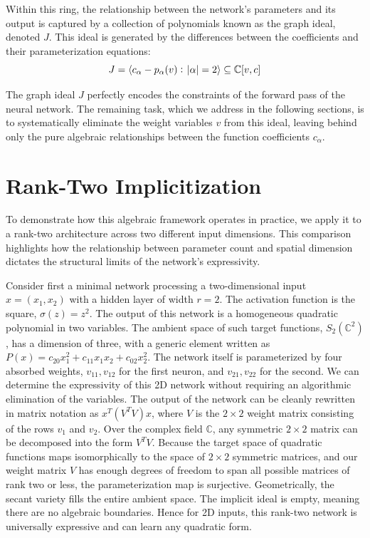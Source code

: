 \documentclass[12pt]{amsproc}
\renewcommand{\-}{\setminus}
\newcommand\<{\langle}
\renewcommand\>{\rangle}
\theoremstyle{plain}
\theoremstyle{definition}
\theoremstyle{remark}
\begin{document}
Within this ring, the relationship between the network's parameters and its output is captured by a collection of polynomials known as the graph ideal, denoted $J$. This ideal is generated by the differences between the coefficients and their parameterization equations:
\[
J = \langle c_\alpha - p_\alpha(v) : \; \abs{\alpha}=2 \rangle \subseteq \mathbb{C}[v, c]
\]

The graph ideal $J$ perfectly encodes the constraints of the forward pass of the neural network. The remaining task, which we address in the following sections, is to systematically eliminate the weight variables $v$ from this ideal, leaving behind only the pure algebraic relationships between the function coefficients $c_\alpha$.

\section{Rank-Two Implicitization}

To demonstrate how this algebraic framework operates in practice, we apply it to a rank-two architecture across two different input dimensions. This comparison highlights how the relationship between parameter count and spatial dimension dictates the structural limits of the network's expressivity.

Consider first a minimal network processing a two-dimensional input $x = (x_1, x_2)$ with a hidden layer of width $r=2$. The activation function is the square, $\sigma(z) = z^2$. The output of this network is a homogeneous quadratic polynomial in two variables. The ambient space of such target functions, $S_2(\mathbb{C}^2)$, has a dimension of three, with a generic element written as $P(x) = c_{20}x_1^2 + c_{11}x_1x_2 + c_{02}x_2^2$. The network itself is parameterized by four absorbed weights, $v_{11}, v_{12}$ for the first neuron, and $v_{21}, v_{22}$ for the second. We can determine the expressivity of this 2D network without requiring an algorithmic elimination of the variables. The output of the network can be cleanly rewritten in matrix notation as $x^T (V^T V) x$, where $V$ is the $2 \times 2$ weight matrix consisting of the rows $v_1$ and $v_2$. Over the complex field $\mathbb{C}$, any symmetric $2 \times 2$ matrix can be decomposed into the form $V^T V$. Because the target space of quadratic functions maps isomorphically to the space of $2 \times 2$ symmetric matrices, and our weight matrix $V$ has enough degrees of freedom to span all possible matrices of rank two or less, the parameterization map is surjective. Geometrically, the secant variety fills the entire ambient space. The implicit ideal is empty, meaning there are no algebraic boundaries. Hence for 2D inputs, this rank-two network is universally expressive and can learn any quadratic form.
\end{document}
